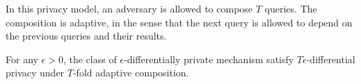 \begin{frame}
{      \begin{definition}
        In this privacy model, an adversary is allowed to compose $T$ queries. The composition is \alert{adaptive}, in the sense that the next query is allowed to depend on the previous queries and their results.
      \end{definition}
      \begin{theorem}
        For any $\epsilon > 0$, the class of $\epsilon$-differentially private mechanism satisfy $T \epsilon$-differential privacy under $T$-fold adaptive composition.
      \end{theorem}
 }
\end{frame}

